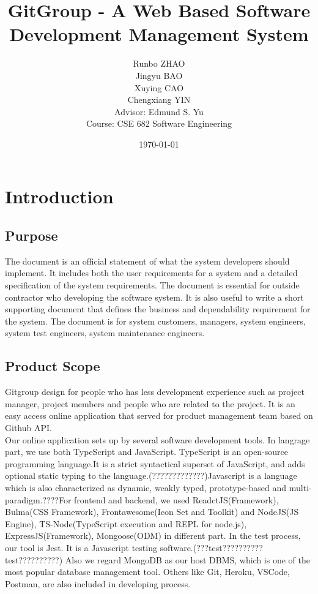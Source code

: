 \documentclass[12pt,a4paper]{report}
\title{GitGroup - A Web Based Software Development Management System}
\date{\today}
\author{Runbo ZHAO \\ Jingyu BAO \\ Xuying CAO \\ Chengxiang YIN
\\[1cm]{\small Advisor: Edmund S. Yu} \\ {\small Course: CSE 682 Software Engineering}}
\begin{document}

\maketitle
\tableofcontents
\newpage

\cleardoublepage
{}
\pagestyle{fancy}

\chapter{Introduction}
\section{Purpose}
The document is an official statement of what the system developers should implement. It includes both the user requirements for a system and a detailed specification of the system requirements. The document is essential for outside contractor who developing the software system. It is also useful to write a short supporting document that defines the business and dependability requirement for the system. The document is for system customers, managers, system engineers, system test engineers, system maintenance engineers.
\section{Product Scope}
Gitgroup design for people who has less development experience such as project manager, project members and people who are related to the project. It is an easy access online application that served for product management team based on Github API. \\
Our online application sets up by several software development tools. In langrage part, we use both TypeScript and JavaScript. TypeScript is an open-source programming language.It is a strict syntactical superset of JavaScript, and adds optional static typing to the language.(?????????????)Javascript is a language which is also characterized as dynamic, weakly typed, prototype-based and multi-paradigm.????For frontend and backend, we used ReadctJS(Framework), Bulma(CSS Framework), Frontawesome(Icon Set and Toolkit) and NodeJS(JS Engine), TS-Node(TypeScript execution and REPL for node.js), ExpressJS(Framework), Mongoose(ODM) in different part. In the test process, our tool is Jest. It is a Javascript testing software.(???test??????????test??????????) Also we regard MongoDB as our host DBMS, which is one of the most popular database management tool. Others like Git, Heroku, VSCode, Postman, are also included in developing process.\\
\end{document}
